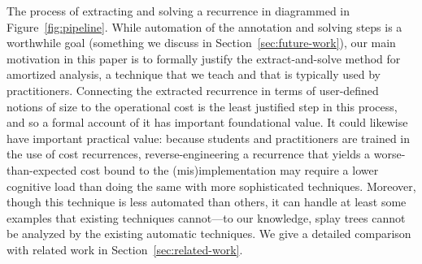 The process of extracting and solving a recurrence in diagrammed in
Figure~\ref{fig:pipeline}.
While automation of the annotation and solving steps
is a worthwhile goal (something we discuss in
Section~\ref{sec:future-work}),
our
main motivation in this paper is to formally justify the
extract-and-solve method for amortized analysis, a technique that we teach and that is
typically used by practitioners.  Connecting the extracted recurrence in
terms of user-defined notions of size to the operational cost is the
least justified step in this process, and so a formal account of it has
important foundational value.  It could likewise have important
practical value: because students and practitioners are trained in the
use of cost recurrences, reverse-engineering a recurrence that yields a
worse-than-expected cost bound to the (mis)implementation may require
a lower cognitive load than doing the same with more
sophisticated techniques.  Moreover, though this technique is less
automated than others, it can handle at least some examples that
existing techniques cannot---to our knowledge, splay trees cannot be
analyzed by the existing automatic techniques.
We give a detailed comparison with related work in Section~\ref{sec:related-work}.



